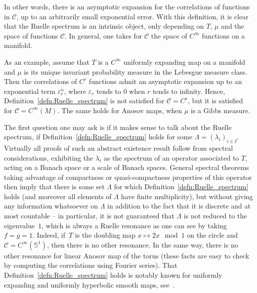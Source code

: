 \documentclass[JEP,XML,SOM,Unicode]{cedram}
\newcommand{\boC}{\mathcal{C}}
\newcommand{\Sbb}{\mathbb{S}}
\let\epsilon\varepsilon
\theoremstyle{definition}
\numberwithin{equation}{section}
\begin{document}
In other words, there is an asymptotic expansion for the correlations of
functions in $\boC$, up to an arbitrarily small exponential error. With this
definition, it is clear that the Ruelle spectrum is an intrinsic object, only
depending on $T$, $\mu$ and the space of functions $\boC$. In general, one
takes for $\boC$ the space of $C^\infty$ functions on a manifold.

As an example, assume that $T$ is a $C^\infty$ uniformly expanding map on a
manifold and $\mu$ is its unique invariant probability measure in the
Lebesgue measure class. Then the correlations of $C^r$ functions admit an
asymptotic expansion up to an exponential term $\epsilon_r^n$, where
$\epsilon_r$ tends to $0$ when $r$ tends to infinity. Hence,
Definition~\ref{defn:Ruelle_spectrum} is not satisfied for $\boC = C^r$, but
it is satisfied for $\boC = C^\infty(M)$. The same holds for Anosov maps,
when $\mu$ is a Gibbs measure.

The first question one may ask is if it makes sense to talk about the Ruelle
spectrum, \ie if Definition~\ref{defn:Ruelle_spectrum} holds for some
$\Lambda=(\lambda_i)_{i\in I}$. Virtually all proofs of such an abstract
existence result follow from spectral considerations, exhibiting the
$\lambda_i$ as the spectrum of an operator associated to $T$, acting on a
Banach space or a scale of Banach spaces. General spectral theorems taking
advantage of compactness or quasi-compactness properties of this operator
then imply that there is some set $\Lambda$ for which
Definition~\ref{defn:Ruelle_spectrum} holds (and moreover all elements of
$\Lambda$ have finite multiplicity), but without giving any information
whatsoever on $\Lambda$ in addition to the fact that it is discrete and at
most countable -- in particular, it is not guaranteed that $\Lambda$ is not
reduced to the eigenvalue~$1$, which is always a Ruelle resonance as one can
see by taking $f=g=1$. Indeed, if~$T$ is the doubling map $x \mapsto 2 x \mod
1$ on the circle and $\boC=C^\infty(\Sbb^1)$, then there is no other
resonance. In the same way, there is no other resonance for linear Anosov map
of the torus (these facts are easy to check by computing the correlations
using Fourier series). That Definition~\ref{defn:Ruelle_spectrum} holds is
notably known for uniformly expanding and uniformly hyperbolic smooth maps,
see~\cite{ruelle_fredholm, bt_aniso,GL_Anosov2}.
\end{document}
